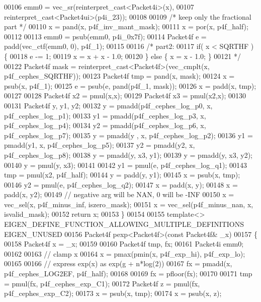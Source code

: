 \begin{DoxyCode}
00106   emm0 = vec\_sr(reinterpret\_cast<Packet4i>(x),
00107                 reinterpret\_cast<Packet4ui>(p4i\_23));
00108 
00109   \textcolor{comment}{/* keep only the fractional part */}
00110   x = pand(x, p4f\_inv\_mant\_mask);
00111   x = por(x, p4f\_half);
00112 
00113   emm0 = psub(emm0, p4i\_0x7f);
00114   Packet4f e = padd(vec\_ctf(emm0, 0), p4f\_1);
00115 
00116   \textcolor{comment}{/* part2:}
00117 \textcolor{comment}{     if( x < SQRTHF ) \{}
00118 \textcolor{comment}{       e -= 1;}
00119 \textcolor{comment}{       x = x + x - 1.0;}
00120 \textcolor{comment}{     \} else \{ x = x - 1.0; \}}
00121 \textcolor{comment}{  */}
00122   Packet4f mask = \textcolor{keyword}{reinterpret\_cast<}Packet4f\textcolor{keyword}{>}(vec\_cmplt(x, p4f\_cephes\_SQRTHF));
00123   Packet4f tmp = pand(x, mask);
00124   x = psub(x, p4f\_1);
00125   e = psub(e, pand(p4f\_1, mask));
00126   x = padd(x, tmp);
00127 
00128   Packet4f x2 = pmul(x,x);
00129   Packet4f x3 = pmul(x2,x);
00130 
00131   Packet4f y, y1, y2;
00132   y  = pmadd(p4f\_cephes\_log\_p0, x, p4f\_cephes\_log\_p1);
00133   y1 = pmadd(p4f\_cephes\_log\_p3, x, p4f\_cephes\_log\_p4);
00134   y2 = pmadd(p4f\_cephes\_log\_p6, x, p4f\_cephes\_log\_p7);
00135   y  = pmadd(y , x, p4f\_cephes\_log\_p2);
00136   y1 = pmadd(y1, x, p4f\_cephes\_log\_p5);
00137   y2 = pmadd(y2, x, p4f\_cephes\_log\_p8);
00138   y = pmadd(y, x3, y1);
00139   y = pmadd(y, x3, y2);
00140   y = pmul(y, x3);
00141 
00142   y1 = pmul(e, p4f\_cephes\_log\_q1);
00143   tmp = pmul(x2, p4f\_half);
00144   y = padd(y, y1);
00145   x = psub(x, tmp);
00146   y2 = pmul(e, p4f\_cephes\_log\_q2);
00147   x = padd(x, y);
00148   x = padd(x, y2);
00149   \textcolor{comment}{// negative arg will be NAN, 0 will be -INF}
00150   x = vec\_sel(x, p4f\_minus\_inf, iszero\_mask);
00151   x = vec\_sel(p4f\_minus\_nan, x, isvalid\_mask);
00152   \textcolor{keywordflow}{return} x;
00153 \}
00154 
00155 \textcolor{keyword}{template}<> EIGEN\_DEFINE\_FUNCTION\_ALLOWING\_MULTIPLE\_DEFINITIONS EIGEN\_UNUSED
00156 Packet4f pexp<Packet4f>(\textcolor{keyword}{const} Packet4f& \_x)
00157 \{
00158   Packet4f x = \_x;
00159 
00160   Packet4f tmp, fx;
00161   Packet4i emm0;
00162 
00163   \textcolor{comment}{// clamp x}
00164   x = pmax(pmin(x, p4f\_exp\_hi), p4f\_exp\_lo);
00165 
00166   \textcolor{comment}{// express exp(x) as exp(g + n*log(2))}
00167   fx = pmadd(x, p4f\_cephes\_LOG2EF, p4f\_half);
00168 
00169   fx = pfloor(fx);
00170 
00171   tmp = pmul(fx, p4f\_cephes\_exp\_C1);
00172   Packet4f z = pmul(fx, p4f\_cephes\_exp\_C2);
00173   x = psub(x, tmp);
00174   x = psub(x, z);

\end{DoxyCode}

